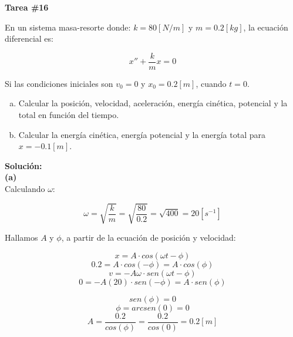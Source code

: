\documentclass[letter,11pt]{article}
\begin{document}
\begin{center}
    {\Large \bf{Tarea \#16}}
\end{center}

En un sistema masa-resorte donde: $k = 80[N/m]$ y $m = 0.2 [kg]$, la ecuación
diferencial es:

\begin{equation}
    x'' + \frac{k}{m} x = 0
\end{equation}

Si las condiciones iniciales son $v_0 = 0$ y $x_0 = 0.2 [m]$, cuando
$t = 0$.

\begin{enumerate}[a)]
    \item Calcular la posición, velocidad, aceleración, energía cinética,
        potencial y la total en función del tiempo.
    \item Calcular la energía cinética, energía potencial y la energía total
        para $x = -0.1 [m]$.
\end{enumerate}

\vspace{0.5cm}
\textbf{Solución:} \\

\textbf{(a)} \\

Calculando $\omega$:

\begin{equation}
    \omega = \sqrt{\frac{k}{m}} = \sqrt{\frac{80}{0.2}} = \sqrt{400} = 20 [s^{-1}]
\end{equation}

Hallamos $A$ y $\phi$, a partir de la ecuación de posición y velocidad:

\begin{equation*}
    x = A \cdot cos(\omega t - \phi)
\end{equation*}
\begin{equation*}
    0.2 = A \cdot cos(-\phi) = A \cdot cos(\phi)
\end{equation*}
\begin{equation*}
    v = -A \omega \cdot sen(\omega t - \phi)
\end{equation*}
\begin{equation*}
    0 = -A (20) \cdot sen(-\phi) = A \cdot sen(\phi)
\end{equation*}

\begin{equation*}
    sen(\phi) = 0
\end{equation*}
\begin{equation*}
    \phi = arcsen(0) = 0
\end{equation*}
\begin{equation*}
    A = \frac{0.2}{cos(\phi)} = \frac{0.2}{cos(0)} = 0.2 [m]
\end{equation*}
\end{document}

